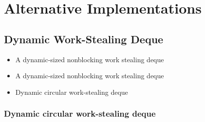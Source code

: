 









\section{Alternative Implementations}
\label{sec:queues-alternative-implementations}


\subsection{Dynamic Work-Stealing Deque}

\begin{itemize}
\item A dynamic-sized nonblocking work stealing deque
  \cite{Hendler2006}
\item A dynamic-sized nonblocking work stealing deque
  \cite{Hendler2006a}
\item Dynamic circular work-stealing deque \cite{Chase2005}
\end{itemize}

\subsubsection{Dynamic circular work-stealing deque \cite{Chase2005}}

